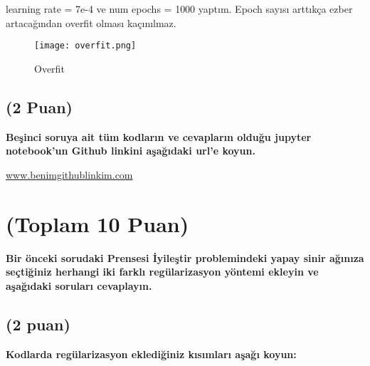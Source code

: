 \documentclass[11pt]{article}
\begin{document}
learning rate = 7e-4 ve num epochs = 1000 yaptım. Epoch sayısı arttıkça ezber artacağından overfit olması kaçınılmaz.

\begin{figure}[H]
    \centering
    \texttt{[image: overfit.png]}
    \caption{Overfit}
    \label{fig:my_pic}
\end{figure}

\subsection{(2 Puan)} \textbf{Beşinci soruya ait tüm kodların ve cevapların olduğu jupyter notebook'un Github linkini aşağıdaki url'e koyun.}

\url{www.benimgithublinkim.com}

\section{(Toplam 10 Puan)} \textbf{Bir önceki sorudaki Prensesi İyileştir problemindeki yapay sinir ağınıza seçtiğiniz herhangi iki farklı regülarizasyon yöntemi ekleyin ve aşağıdaki soruları cevaplayın.} 

\subsection{(2 puan)} \textbf{Kodlarda regülarizasyon eklediğiniz kısımları aşağı koyun:} 
\end{document}

